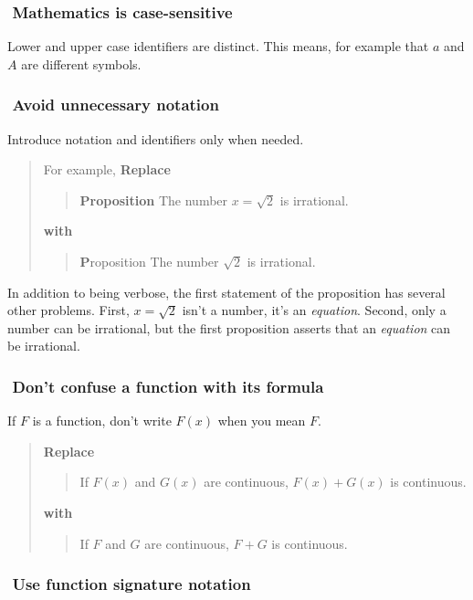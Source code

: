 \documentclass[12pt]{article}
\newcounter{ex}\setcounter{ex}{0}
\newcommand{\ex}{%
\hspace{-0.2in} \setcounter{ex}{\value{ex}+1}
\theex \,\,}
\newcounter{id}\setcounter{id}{0}
\newcounter{se}\setcounter{se}{0}
\begin{document}
\subsubsection*{\ex Mathematics is case-sensitive}

Lower and upper case identifiers are distinct.  This means, for
example that \(a\) and \(A\) are different symbols.

\subsubsection*{\ex  Avoid unnecessary notation}

Introduce notation and identifiers only when needed. 
\begin{quote}
For example, \textbf{Replace}
\begin{quote}
 \textbf {Proposition} The number \(x = \sqrt{2}\) is irrational.
\end{quote}
\textbf{with}
\begin{quote}
{ \textbf Proposition} The number \(\sqrt{2}\) is irrational.
\end{quote}
\end{quote}
In addition to being verbose, the first statement of the 
proposition has several other problems. First, \(x = \sqrt{2}\) isn't 
a number, it's an  {\em equation}. Second, only a number can be 
irrational, but the first proposition asserts that an {\em equation\/}
can be irrational. 

\subsubsection*{\ex  Don't confuse a function with its formula}

If \(F\) is a function, don't write \(F(x)\) when you mean \(F\).

\begin{quote}
\textbf{\textbf{Replace}}
\begin{quote}
If \(F(x) \) and \(G(x)\) are continuous, \(F(x) + G(x)\) is 
continuous.
\end{quote}
\textbf{with}
\begin{quote}
If \(F\) and \(G\) are continuous, \(F + G\) is 
continuous.
\end{quote}
\end{quote}

\subsubsection*{\ex  Use function signature notation}
\end{document}
